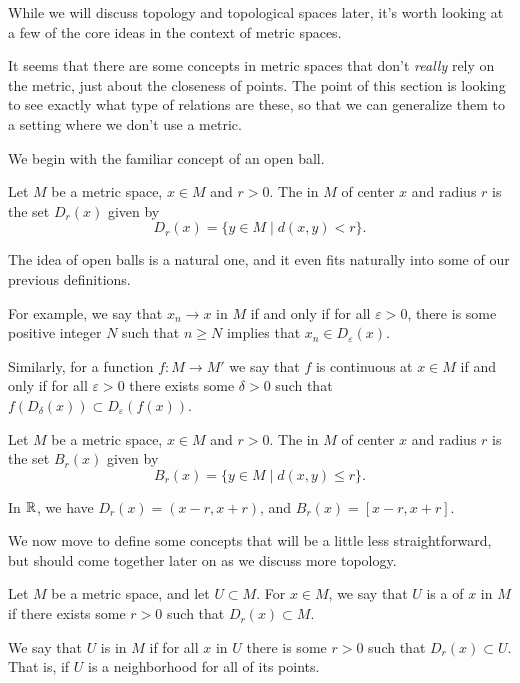 \documentclass[a4paper]{scrartcl}
\begin{document}
While we will discuss topology and topological spaces later, it's worth looking at a few of the core ideas in the context of metric spaces.

It seems that there are some concepts in metric spaces that don't \emph{really} rely on the metric, just about the closeness of points. The point of this section is looking to see exactly what type of relations are these, so that we can generalize them to a setting where we don't use a metric.

We begin with the familiar concept of an open ball.

\begin{definition}
    Let $M$ be a metric space, $x \in M$ and $r > 0$. The  in $M$ of center $x$ and radius $r$ is the set $D_r(x)$ given by
    $$
    D_r(x) = \{y \in M \mid d(x, y) < r \}.
    $$
\end{definition}

The idea of open balls is a natural one, and it even fits naturally into some of our previous definitions.

For example, we say that $x_n \rightarrow x$ in $M$ if and only if for all $\varepsilon > 0$, there is some positive integer $N$ such that $n \geq N$ implies that $x_n \in D_{\varepsilon}(x)$.

Similarly, for a function $f: M \rightarrow M'$ we say that $f$ is continuous at $x \in M$ if and only if for all $\varepsilon > 0$ there exists some $\delta > 0$ such that $f(D_{\delta}(x)) \subset D_{\varepsilon}(f(x))$.

\begin{definition}
    Let $M$ be a metric space, $x \in M$ and $r > 0$. The  in $M$ of center $x$ and radius $r$ is the set $B_r(x)$ given by
    $$
B_r(x) = \{y \in M \mid d(x, y) \leq r\}.
    $$
\end{definition}

\begin{example}
    In $\mathbb{R}$, we have $D_r(x) = (x - r, x + r)$, and $B_r(x) = [x - r, x + r]$.
\end{example}

We now move to define some concepts that will be a little less straightforward, but should come together later on as we discuss more topology.

\begin{definition}[Neighborhood]
    Let $M$ be a metric space, and let $U \subset M$. For $x \in M$, we say that $U$ is a  of $x$ in $M$ if there exists some $r > 0$ such that $D_r(x) \subset M$.
\end{definition}
\begin{definition}[Open]
    We say that $U$ is  in $M$ if for all $x$ in $U$ there is some $r > 0$ such that $D_r(x) \subset U$. That is, if $U$ is a neighborhood for all of its points.
\end{definition}
\end{document}
